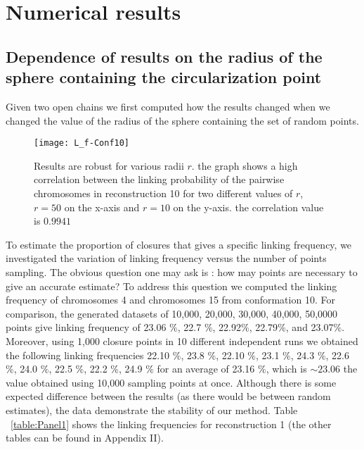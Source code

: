 \documentclass{iopart}
\begin{document}
\medskip
\section{Numerical results}

\subsection{Dependence of results on the radius of the sphere containing the circularization point} 
Given two open chains we first computed how the results changed when we changed the value of the radius of the sphere containing the set of random points. 

\begin{figure}[!htb]
\begin{center}
\texttt{[image: L\_f-Conf10]}
\end{center}
\caption{Results are robust for various radii $r$. the graph shows a high correlation between the linking probability of the pairwise chromosomes in reconstruction 10 for   two different values of $r$, $r=50$ on the x-axis and $r=10$ on the y-axis. the correlation value is $ 0.9941$ \label{fig:L_f-Conf10}}
\end{figure}

To estimate the proportion of closures that gives a specific linking frequency, we investigated the variation of linking frequency versus the number of points sampling. The obvious question one may ask is : how may points are necessary to give an accurate estimate? To address this question we computed the linking frequency of chromosomes 4 and chromosomes 15 from conformation 10.  For comparison, the generated datasets of 10,000, 20,000, 30,000, 40,000, 50,0000 points give linking frequency of 23.06 $\%$, 22.7 $\%$, 22.92$\%$, 22.79$\%$, and 23.07$\%$.  Moreover, using 1,000  closure points in 10 different independent runs we obtained the following linking frequencies 22.10 $\%$, 23.8 $\%$, 22.10 $\%$, 23.1 $\%$, 24.3 $\%$, 22.6 $\%$, 24.0 $\%$, 22.5 $\%$, 22.2 $\%$, 24.9 $\%$ for an average of 23.16 $\%$, which is $ \sim 23.06$ the value obtained  using 10,000 sampling points at once.  Although there is some expected difference between the results (as there would be between random estimates), the data demonstrate the stability of our method. 
Table ~\ref{table:Panel1}  shows the linking frequencies for reconstruction 1 (the other tables can be found in Appendix II). 
\end{document}
